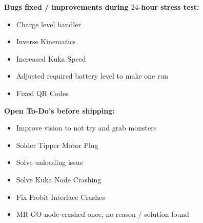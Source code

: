 \textbf{Bugs fixed / improvements during $24$-hour stress test:}
\begin{itemize}
\item Charge level handler
\item Inverse Kinematics
\item Increased Kuka Speed
\item Adjusted required battery level to make one run
\item Fixed QR Codes
\end{itemize}

\textbf{Open To-Do's before shipping:}
\begin{itemize}
\item Improve vision to not try and grab monsters
\item Solder Tipper Motor Plug
\item Solve unloading issue
\item Solve Kuka Node Crashing
\item Fix Frobit Interface Crashes
\item MR GO node crashed once, no reason / solution found
\end{itemize}

